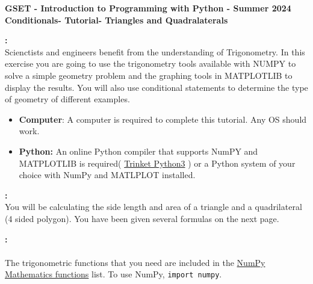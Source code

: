\documentclass[12pt]{article}
\newcommand{\MNUM}{6} %
\newcommand{\MNAME}{Conditionals} %
\newcommand{\TNAME}{Triangles and Quadralaterals} %
\newcommand{\SEM}{Summer 2024}
\begin{document}
    \thispagestyle{plain}

    \begin{center}
       {\bf \large GSET - Introduction to Programming with Python - \SEM} \vspace{5mm}\\
       {\bf \Large \MNAME \hspc -  Tutorial\hspc\MNUM\hspc - \TNAME}\vspace{3mm}\\      
    \end{center}

	\begin{description}[labelindent=1cm]

        \item [\textbf{\underline{Overview}}]\textbf{:} \\ 
        Scienctists and engineers benefit from the understanding of Trigonometry. In this exercise you are going to use the trigonometry tools available with NUMPY to solve a simple geometry problem and the graphing tools in MATPLOTLIB to display the results. You will also use conditional statements to determine the type of geometry of different examples.

        \item[\textbf{\underline{System Requirements:}}] \hfill \vspace{0mm}
        \begin{itemize}
            \item {\bf Computer}: A computer is required to complete this tutorial. Any OS should work.
            \item {\bf Python:} An online Python compiler that supports NumPY and MATPLOTLIB is required( \href{https://trinket.io/embed/python3/a5bd54189b}{Trinket Python3} ) or a Python system of your choice with NumPy and MATLPLOT installed.
        \end{itemize}

        \item [\textbf{\underline{Simple Geometry - Area of a Polygon}}]\textbf{:} \\
        You will be calculating the side length and area of a triangle and a quadrilateral (4 sided polygon). You have been given several formulas on the next page. \\

        \item [\textbf{\underline{Trigonometric Functions from NumPy}}]\textbf{:}\\\\ The trigonometric functions that you need are included in the \href{https://numpy.org/doc/stable/reference/routines.math.html}{NumPy Mathematics functions} list. To use NumPy, \lstinline{import numpy}.   


\end{description}
\end{document}
